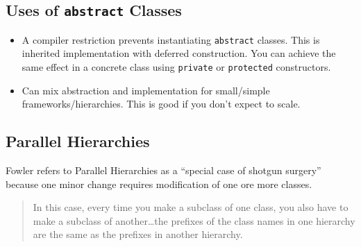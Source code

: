 \documentclass[12pt,notitlepage]{article}
\begin{document}
\begin{s5presentation}
\begin{s5slide}
      \subsection{Uses of \texttt{abstract} Classes}
      \begin{itemize}
        \item A compiler restriction prevents instantiating \texttt{abstract} classes. This
          is inherited implementation with deferred construction. You can achieve the same 
          effect in a concrete class using \texttt{private} or \texttt{protected} constructors.
        \item Can mix abstraction and implementation for small/simple frameworks/hierarchies.
          This is good if you don't expect to scale.         
      \end{itemize}
      \W \end{s5slide}
  
  \W \begin{s5slide}
    \section{Parallel Hierarchies}
    \begin{tex}
      Fowler refers to Parallel Hierarchies as a ``special case of shotgun surgery'' because one minor change requires modification of 
      one ore more classes. 
      \begin{quote}
        In this case, every time you make a subclass of one class, you also have to make a subclass of another\ldots the prefixes of 
        the class names in one hierarchy are the same as the prefixes in another hierarchy.
      \end{quote}
      

\end{tex}
\end{s5slide}
\end{s5presentation}
\end{document}
